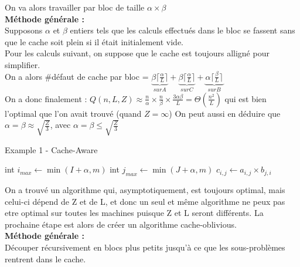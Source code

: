 \documentclass[
  paper=a4,
  ,captions=tableheading
]{scrartcl}
\begin{document}
On va alors travailler par bloc de taille \(\alpha \times \beta\)\\
\textbf{Méthode générale :}\\
Supposons \(\alpha\) et \(\beta\) entiers tels que les calculs effectués
dans le bloc se fassent sans que le cache soit plein si il était
initialement vide.\\
Pour les calculs suivant, on suppose que le cache est toujours alligné
pour simplifier.\\
On a alors \#défaut de cache par bloc =
\(\underbrace{ \beta\lceil \frac{\alpha}{L}\rceil}_{sur A}+ \underbrace{\beta\lceil \frac{\alpha}{L}\rceil}_{sur C} + \underbrace{ \alpha\lceil \frac{\beta}{L}\rceil}_{sur B}\)\\
On a donc finalement :
\(Q(n,L,Z) \approx \frac{n}{\alpha} \times \frac{n}{\beta} \times \frac{3 \alpha\beta}{L} = \Theta(\frac{n^2}{L})\)
qui est bien l'optimal que l'on avait trouvé (quand \(Z = \infty\)) On
peut aussi en déduire que \(\alpha = \beta \approx \sqrt{\frac{Z}{3}}\),
avec \(\alpha = \beta \leq \sqrt{\frac{Z}{3}}\)

\begin{algorithm}[H]
\caption{Example 1 - Cache-Aware}
\begin{algorithmic}[2]
\Statex
 
    \State int $i_{max} \gets \min(I+\alpha, m)$
      \State int $j_{max} \gets \min(J+\alpha, m)$
        \State $c_{i,j} \gets a_{i,j} \times b_{j,i}$
        \EndFor
      \EndFor
    \EndFor
  \EndFor
\end{algorithmic}
\end{algorithm}

On a trouvé un algorithme qui, asymptotiquement, est toujours optimal,
mais celui-ci dépend de Z et de L, et donc un seul et même algorithme ne
peux pas etre optimal sur toutes les machines puisque Z et L seront
différents. La prochaine étape est alors de créer un algorithme
cache-oblivious.\\
\textbf{Méthode générale :}\\
Découper récursivement en blocs plus petits jusqu'à ce que les
sous-problèmes rentrent dans le cache.
\end{document}
